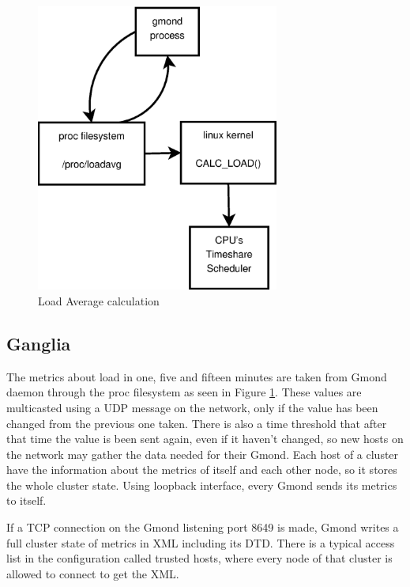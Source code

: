 \begin{figure}[htb]
\centering
 \includegraphics[width=80mm]{images/calc_load.eps}
\caption{Load Average calculation}
\label{figure:calc_load}
\end{figure}


\subsection{Ganglia}\label{subsec:ganglia}

The metrics about load in one, five and fifteen minutes are taken from Gmond daemon through the proc filesystem as seen in Figure \ref{figure:calc_load}. These values are multicasted using a UDP message on the network, only if the value has been changed from the previous one taken. There is also a time threshold that after that time the value is been sent again, even if it haven't changed, so new hosts on the network may gather the data needed for their Gmond. Each host of a cluster have the information about the metrics of itself and each other node, so it stores the whole cluster state. Using loopback interface, every Gmond sends its metrics to itself.

If a TCP connection on the Gmond listening port 8649 is made, Gmond writes a full cluster state of metrics in XML including its DTD. There is a typical access list in the configuration called trusted hosts, where every node of that cluster is allowed to connect to get the XML.

